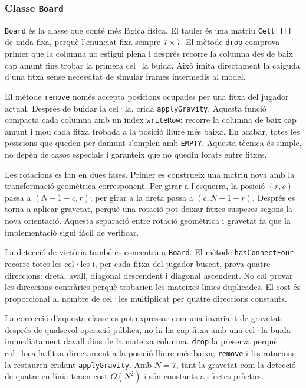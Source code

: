 \documentclass[conference,compsoc]{IEEEtran}
\begin{document}
\subsubsection{Classe \texttt{Board}}

\texttt{Board} és la classe que conté més lògica física. El tauler és una matriu
\texttt{Cell[][]} de mida fixa, perquè l'enunciat fixa sempre $7\times7$. El
mètode \texttt{drop} comprova primer que la columna no estigui plena i després
recorre la columna des de baix cap amunt fins trobar la primera cel·la buida. Això
imita directament la caiguda d'una fitxa sense necessitat de simular frames
intermedis al model.

El mètode \texttt{remove} només accepta posicions ocupades per una fitxa del
jugador actual. Després de buidar la cel·la, crida \texttt{applyGravity}. Aquesta
funció compacta cada columna amb un índex \texttt{writeRow}: recorre la columna de
baix cap amunt i mou cada fitxa trobada a la posició lliure més baixa. En acabar,
totes les posicions que queden per damunt s'omplen amb \texttt{EMPTY}. Aquesta
tècnica és simple, no depèn de casos especials i garanteix que no quedin forats
entre fitxes.

Les rotacions es fan en dues fases. Primer es construeix una matriu nova amb la
transformació geomètrica corresponent. Per girar a l'esquerra, la posició
$(r,c)$ passa a $(N-1-c,r)$; per girar a la dreta passa a $(c,N-1-r)$. Després es
torna a aplicar gravetat, perquè una rotació pot deixar fitxes suspeses segons la
nova orientació. Aquesta separació entre rotació geomètrica i gravetat fa que la
implementació sigui fàcil de verificar.

La detecció de victòria també es concentra a \texttt{Board}. El mètode
\texttt{hasConnectFour} recorre totes les cel·les i, per cada fitxa del jugador
buscat, prova quatre direccions: dreta, avall, diagonal descendent i diagonal
ascendent. No cal provar les direccions contràries perquè trobarien les mateixes
línies duplicades. El cost és proporcional al nombre de cel·les multiplicat per
quatre direccions constants.

La correcció d'aquesta classe es pot expressar com una invariant de gravetat:
després de qualsevol operació pública, no hi ha cap fitxa amb una cel·la buida
immediatament davall dins de la mateixa columna. \texttt{drop} la preserva perquè
col·loca la fitxa directament a la posició lliure més baixa; \texttt{remove} i les
rotacions la restauren cridant \texttt{applyGravity}. Amb $N=7$, tant la gravetat
com la detecció de quatre en línia tenen cost $O(N^2)$ i són constants a efectes
pràctics.
\end{document}
